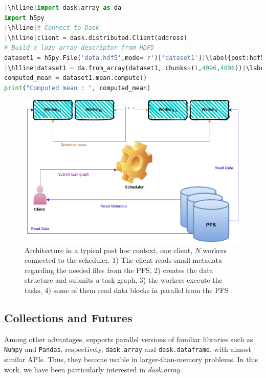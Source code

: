 \begin{lstlisting}[float, label=listdask, language=python, caption=Parallel post hoc mean with \dask. Lines differing from the analysis of Listing~\ref{listnumpy} are highlighted]
|\hlline|import dask.array as da
import h5py
|\hlline|# Connect to Dask
|\hlline|client = dask.distributed.Client(address)
# Build a lazy array descriptor from HDF5
dataset1 = h5py.File('data.hdf5',mode='r')['dataset1']|\label{post:hdf5}|
|\hlline|dataset1 = da.from_array(dataset1, chunks=(1,4096,4096))|\label{post:chunk}|
computed_mean = dataset1.mean.compute()
print("Computed mean : ", computed_mean)
\end{lstlisting}

\begin{figure}[tb]\centering
\includegraphics[scale=0.8]{figures/DaskArchiecture.pdf}
\caption{\dask Architecture in a typical post hoc context, one client, $N$ workers connected to the scheduler. 1) The client reads small metadata regarding the needed files from the PFS, 2) creates the \dask data structure and submits a task graph, 3) the workers execute the tasks, 4) some of them read data blocks in parallel from the PFS}
\label{figdaskarchi}
\end{figure}

\subsection{\dask Collections and Futures}

Among other advantages, \dask supports parallel versions of familiar libraries such as \texttt{Numpy} and \texttt{Pandas}, respectively, \texttt{dask.array} and \texttt{dask.dataframe}, with almost similar APIs. 
Thus, they become usable in larger-than-memory problems. In this work, we have been particularly interested in \textit{dask.array}. 

